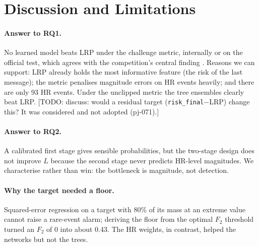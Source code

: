 \documentclass[clean,twocolumn]{bam-proposal}
\newcommand{\todo}[1]{{\color{red}[TODO: #1]}}
\begin{document}
\section{Discussion and Limitations}\label{sec:discussion}

\paragraph{Answer to RQ1.} No learned model beats LRP under the challenge metric, internally or on the official test, which agrees with the competition's central finding \citep{uriot2021collision}. Reasons we can support: LRP already holds the most informative feature (the risk of the last message); the metric penalises magnitude errors on HR events heavily; and there are only 93 HR events. Under the unclipped metric the tree ensembles clearly beat LRP. \todo{discuss: would a residual target (\texttt{risk\_final}$-$LRP) change this? It was considered and not adopted (pj-071).}

\paragraph{Answer to RQ2.} A calibrated first stage gives sensible probabilities, but the two-stage design does not improve $L$ because the second stage never predicts HR-level magnitudes. We characterise rather than win: the bottleneck is magnitude, not detection.

\paragraph{Why the target needed a floor.} Squared-error regression on a target with 80\% of its mass at an extreme value cannot raise a rare-event alarm; deriving the floor from the optimal $F_2$ threshold turned an $F_2$ of 0 into about 0.43. The HR weights, in contrast, helped the networks but not the trees.
\end{document}

